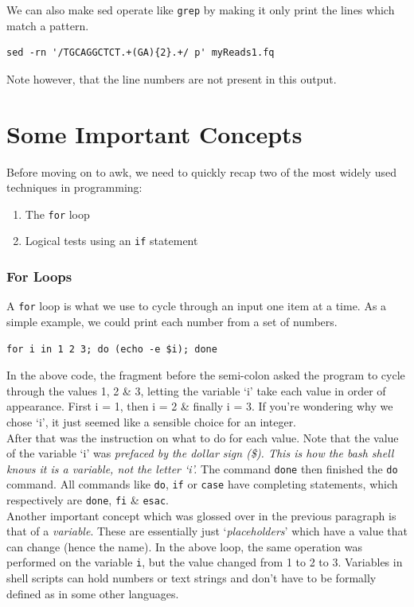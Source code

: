 \documentclass[a4paper,12pt,twoside]{memoir}
\begin{document}
\begin{steps}
We can also make sed operate like \texttt{grep} by making it only print the lines which match a pattern.
\begin{lstlisting}
sed -rn '/TGCAGGCTCT.+(GA){2}.+/ p' myReads1.fq
\end{lstlisting}
Note however, that the line numbers are not present in this output.
\end{steps}

\section{Some Important Concepts}

Before moving on to awk, we need to quickly recap two of the most widely used techniques in programming:
\begin{enumerate}
  \item The \texttt{for} loop
  \item Logical tests using an \texttt{if} statement
\end{enumerate}

\subsubsection*{For Loops}

\begin{steps}
A \texttt{for} loop is what we use to cycle through an input one item at a time.
As a simple example, we could print each number from a set of numbers.
\begin{lstlisting}
for i in 1 2 3; do (echo -e $i); done
\end{lstlisting}
\end{steps}

\begin{information}
In the above code, the fragment before the semi-colon asked the program to cycle through the values 1, 2 \& 3, letting the variable `i' take each value in order of appearance.
First i = 1, then i = 2 \& finally i = 3.
If you're wondering why we chose `i', it just seemed like a sensible choice for an integer. \\

After that was the instruction on what to do for each value.
Note that the value of the variable `i' was \textit{prefaced by the dollar sign (\$).
This is how the bash shell knows it is a variable, not the letter `i'.}
The command \texttt{done} then finished the \texttt{do} command.
All commands like \texttt{do}, \texttt{if} or \texttt{case} have completing statements, which respectively are \texttt{done}, \texttt{fi} \& \texttt{esac}.\\

Another important concept which was glossed over in the previous paragraph is that of a \textit{variable}.
These are essentially just `\textit{placeholders}' which have a value that can change (hence the name).
In the above loop, the same operation was performed on the variable \texttt{i}, but the value changed from 1 to 2 to 3.
Variables in shell scripts can hold numbers or text strings and don't have to be formally defined as in some other languages.
\end{information}
\end{document}
